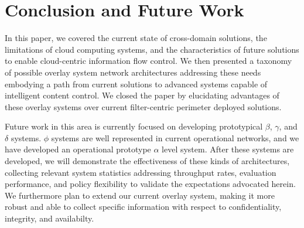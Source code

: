 \documentclass{sig-alternate}
\begin{document}






\section{Conclusion and Future Work}
In this paper, we covered the current state of cross-domain solutions, the limitations of cloud computing systems, and the characteristics of future solutions to enable cloud-centric information flow control.  We then presented a taxonomy of possible overlay system network architectures addressing these needs embodying a path from current solutions to advanced systems capable of intelligent content control.  We closed the paper by elucidating advantages of these overlay systems over current filter-centric perimeter deployed solutions.

Future work in this area is currently focused on developing prototypical $\beta$, $\gamma$, and $\delta$ systems.  $\phi$ systems are well represented in current operational networks, and we have developed an operational prototype $\alpha$ level system.  After these systems are developed, we will demonstrate the effectiveness of these kinds of architectures, collecting relevant system statistics addressing throughput rates, evaluation performance, and policy flexibility to validate the expectations advocated herein.  We furthermore plan to extend our current overlay system, making it more robust and able to collect specific information with respect to confidentiality, integrity, and availabilty.



\end{document}
